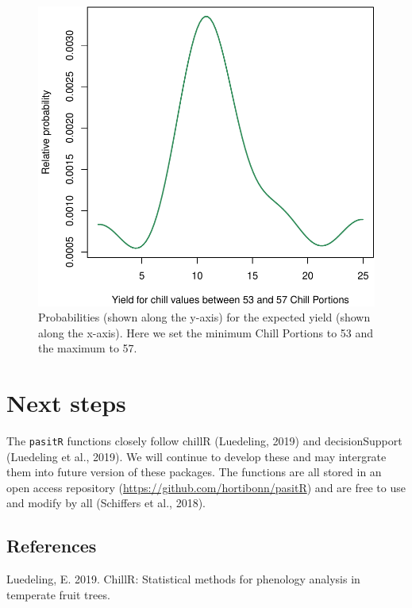 \documentclass[]{article}
\begin{document}
\begin{figure}
\centering
\includegraphics{Chill_Yield_Qta_data_files/figure-latex/unnamed-chunk-6-1.pdf}
\caption{Probabilities (shown along the y-axis) for the expected yield
(shown along the x-axis). Here we set the minimum Chill Portions to 53
and the maximum to 57.}
\end{figure}

\hypertarget{next-steps}{%
\section{Next steps}\label{next-steps}}

The \texttt{pasitR} functions closely follow chillR (Luedeling, 2019)
and decisionSupport (Luedeling et al., 2019). We will continue to
develop these and may intergrate them into future version of these
packages. The functions are all stored in an open access repository
(\url{https://github.com/hortibonn/pasitR}) and are free to use and
modify by all (Schiffers et al., 2018).

\hypertarget{references}{%
\subsection*{References}\label{references}}

\hypertarget{refs}{}
\leavevmode\hypertarget{ref-R-chillR}{}%
Luedeling, E. 2019. ChillR: Statistical methods for phenology analysis
in temperate fruit trees.
\end{document}

